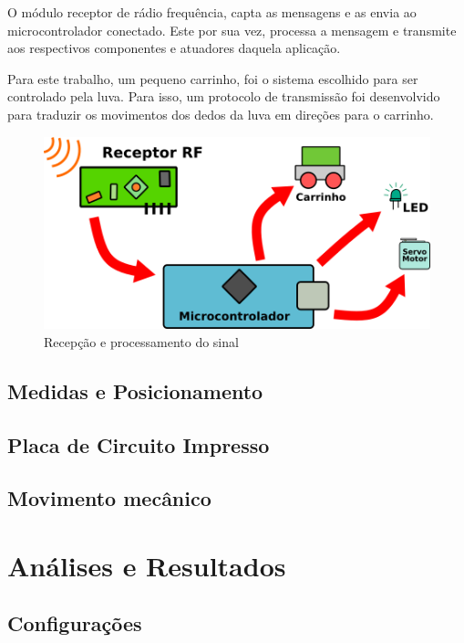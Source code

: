 \documentclass{ufpatcc}
\begin{document}
			O módulo receptor de rádio frequência, capta as mensagens e as envia ao microcontrolador conectado. Este por sua vez, processa a mensagem e transmite aos respectivos componentes e atuadores daquela aplicação.

			Para este trabalho, um pequeno carrinho, foi o sistema escolhido para ser controlado pela luva. Para isso, um protocolo de transmissão foi desenvolvido para traduzir os movimentos dos dedos da luva em direções para o carrinho.
	
		\begin{figure}[h!]
  		\label{fig:receptor-to-app1}
			\centering
  		\includegraphics[scale=0.8]{../pictures/receptor-to-app1.png}
			\caption{Recepção e processamento do sinal}
		\end{figure}
		\section{Medidas e Posicionamento}	

		\section{Placa de Circuito Impresso}
		
		\section{Movimento mecânico}


	\chapter{Análises e Resultados}

		\section{Configurações}
\end{document}
